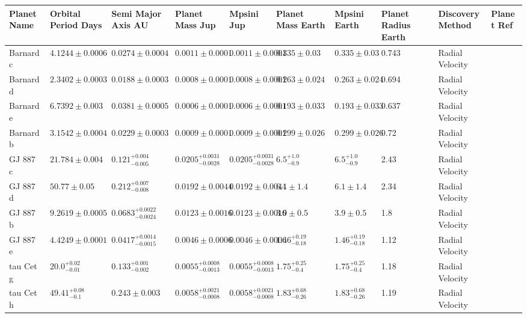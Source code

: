 \begin{tabular}{llllllllll}
\toprule
Planet Name & Orbital Period Days & Semi Major Axis AU & Planet Mass Jup & Mpsini Jup & Planet Mass Earth & Mpsini Earth & Planet Radius Earth & Discovery Method & Planet Ref \\
\midrule
Barnard c & $4.1244 \pm 0.0006$ & $0.0274 \pm 0.0004$ & $0.0011 \pm 0.0001$ & $0.0011 \pm 0.0001$ & $0.335 \pm 0.03$ & $0.335 \pm 0.03$ & 0.743 & Radial Velocity & \cite{BASANT_ET_AL__2025} \\
Barnard d & $2.3402 \pm 0.0003$ & $0.0188 \pm 0.0003$ & $0.0008 \pm 0.0001$ & $0.0008 \pm 0.0001$ & $0.263 \pm 0.024$ & $0.263 \pm 0.024$ & 0.694 & Radial Velocity & \cite{BASANT_ET_AL__2025} \\
Barnard e & $6.7392 \pm 0.003$ & $0.0381 \pm 0.0005$ & $0.0006 \pm 0.0001$ & $0.0006 \pm 0.0001$ & $0.193 \pm 0.033$ & $0.193 \pm 0.033$ & 0.637 & Radial Velocity & \cite{BASANT_ET_AL__2025} \\
Barnard b & $3.1542 \pm 0.0004$ & $0.0229 \pm 0.0003$ & $0.0009 \pm 0.0001$ & $0.0009 \pm 0.0001$ & $0.299 \pm 0.026$ & $0.299 \pm 0.026$ & 0.72 & Radial Velocity & \cite{BASANT_ET_AL__2025} \\
GJ 887 c & $21.784 \pm 0.004$ & $0.121^{+0.004}_{-0.005}$ & $0.0205^{+0.0031}_{-0.0028}$ & $0.0205^{+0.0031}_{-0.0028}$ & $6.5^{+1.0}_{-0.9}$ & $6.5^{+1.0}_{-0.9}$ & 2.43 & Radial Velocity & \cite{HARTOGH_ET_AL_2026} \\
GJ 887 d & $50.77 \pm 0.05$ & $0.212^{+0.007}_{-0.008}$ & $0.0192 \pm 0.0044$ & $0.0192 \pm 0.0044$ & $6.1 \pm 1.4$ & $6.1 \pm 1.4$ & 2.34 & Radial Velocity & \cite{HARTOGH_ET_AL_2026} \\
GJ 887 b & $9.2619 \pm 0.0005$ & $0.0683^{+0.0022}_{-0.0024}$ & $0.0123 \pm 0.0016$ & $0.0123 \pm 0.0016$ & $3.9 \pm 0.5$ & $3.9 \pm 0.5$ & 1.8 & Radial Velocity & \cite{HARTOGH_ET_AL_2026} \\
GJ 887 e & $4.4249 \pm 0.0001$ & $0.0417^{+0.0014}_{-0.0015}$ & $0.0046 \pm 0.0006$ & $0.0046 \pm 0.0006$ & $1.46^{+0.19}_{-0.18}$ & $1.46^{+0.19}_{-0.18}$ & 1.12 & Radial Velocity & \cite{HARTOGH_ET_AL_2026} \\
tau Cet g & $20.0^{+0.02}_{-0.01}$ & $0.133^{+0.001}_{-0.002}$ & $0.0055^{+0.0008}_{-0.0013}$ & $0.0055^{+0.0008}_{-0.0013}$ & $1.75^{+0.25}_{-0.4}$ & $1.75^{+0.25}_{-0.4}$ & 1.18 & Radial Velocity & \cite{FENG_ET_AL__2017} \\
tau Cet h & $49.41^{+0.08}_{-0.1}$ & $0.243 \pm 0.003$ & $0.0058^{+0.0021}_{-0.0008}$ & $0.0058^{+0.0021}_{-0.0008}$ & $1.83^{+0.68}_{-0.26}$ & $1.83^{+0.68}_{-0.26}$ & 1.19 & Radial Velocity & \cite{FENG_ET_AL__2017} \\

\end{tabular}

